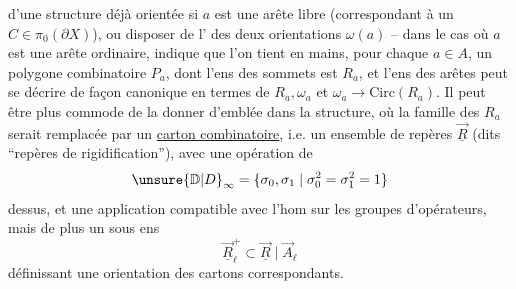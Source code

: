  d'une structure déjà orientée si $a$ est une arête libre (correspondant à un $C\in\pi_0(\partial X)$), ou  disposer de l' des deux orientations $\omega(a)$ -- dans le cas où $a$ est une arête ordinaire, indique que l'on tient en mains, pour chaque $a\in A$, un polygone combinatoire $P_a$, dont l'ens des sommets est $R_a$, et l'ens des arêtes peut se décrire  de façon canonique en termes de $R_a,\omega_a$ et $\omega_a\longrightarrow\mathrm{Circ}(R_a)$. Il peut être plus commode de la donner d'emblée dans la structure, où la famille des $R_a$ serait remplacée par un  \uline{carton combinatoire}, i.e. un ensemble de repères $\underline{\vec R}$ (dits ``repères de rigidification''), avec une opération de
\[
\unsure{\mathbb D|D}_\infty=\{\sigma_0,\sigma_1\mid\sigma_0^2=\sigma_1^2=1\}
\]
dessus, et une application
compatible avec l'hom
sur les groupes d'opérateurs, mais de plus un sous ens
\[
\underline{\vec R}^{+}_\ell\subset\underline{\vec R}\mid\vec A_\ell
\]
définissant une orientation des cartons correspondants.
